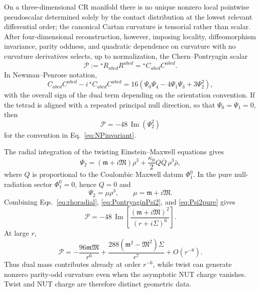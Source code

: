 \documentclass[aps,prd,reprint,nofootinbib,superscriptaddress]{revtex4-2}
\theoremstyle{definition}
\theoremstyle{remark}
\begin{document}
On a three-dimensional CR manifold there is no unique nonzero local pointwise pseudoscalar determined solely by the contact distribution at the lowest relevant differential order; the canonical Cartan curvature is tensorial rather than scalar. After four-dimensional reconstruction, however, imposing locality, diffeomorphism invariance, parity oddness, and quadratic dependence on curvature with no curvature derivatives selects, up to normalization, the Chern--Pontryagin scalar
\begin{equation}
 \mathcal P:={}^{\star}R_{abcd}R^{abcd}
 ={}^{\star}C_{abcd}C^{abcd}.
 \label{eq:Pontryagin}
\end{equation}
In Newman--Penrose notation,
\begin{equation}
 C_{abcd}C^{abcd}-i\,{}^{\star}C_{abcd}C^{abcd}
 =16\left(\Psi_0\Psi_4-4\Psi_1\Psi_3+3\Psi_2^2\right),
 \label{eq:NPinvariant}
\end{equation}
with the overall sign of the dual term depending on the orientation convention. If the tetrad is aligned with a repeated principal null direction, so that $\Psi_0=\Psi_1=0$, then
\begin{equation}
 \boxed{\mathcal P=-48\,\operatorname{Im}(\Psi_2^2)}
 \label{eq:PontryaginPsi2}
\end{equation}
for the convention in Eq.~\eqref{eq:NPinvariant}.

The radial integration of the twisting Einstein--Maxwell equations gives \cite{Stephani2003}
\begin{equation}
 \Psi_2=(\mathfrak m+i\mathfrak M)\rho^3
 +\frac{\kappa_0}{2}Q\bar Q\,\rho^3\bar\rho,
 \label{eq:Psi2EM}
\end{equation}
where $Q$ is proportional to the Coulombic Maxwell datum $\Phi_1^0$. In the pure null-radiation sector $\Phi_1^0=0$, hence $Q=0$ and
\begin{equation}
 \Psi_2=\mu\rho^3,
 \qquad
 \mu=\mathfrak m+i\mathfrak M.
 \label{eq:Psi2pure}
\end{equation}
Combining Eqs.~\eqref{eq:rhoradial}, \eqref{eq:PontryaginPsi2}, and \eqref{eq:Psi2pure} gives
\begin{equation}
 \boxed{
 \mathcal P
 =-48\,\operatorname{Im}\!\left[
 \frac{(\mathfrak m+i\mathfrak M)^2}{(r+i\Sigma)^6}
 \right].}
 \label{eq:PontryaginCR}
\end{equation}
At large $r$,
\begin{equation}
 \mathcal P
 =-\frac{96\mathfrak m\mathfrak M}{r^6}
 +\frac{288(\mathfrak m^2-\mathfrak M^2)\Sigma}{r^7}
 +O(r^{-8}).
 \label{eq:PontryaginAsymptotic}
\end{equation}
Thus dual mass contributes already at order $r^{-6}$, while twist can generate nonzero parity-odd curvature even when the asymptotic NUT charge vanishes. Twist and NUT charge are therefore distinct geometric data.
\end{document}
